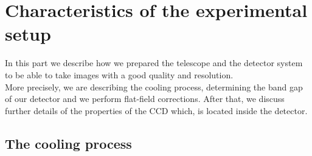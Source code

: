 \chapter{Characteristics of the experimental setup}
In this part we describe how we prepared the telescope and the detector system to be able to take images with a good quality and resolution. \\
More precisely, we are describing the cooling process, determining the band gap of our detector and we perform flat-field corrections. After that, we discuss further details of the properties of the CCD which, is located inside the detector. 

\section{The cooling process}

